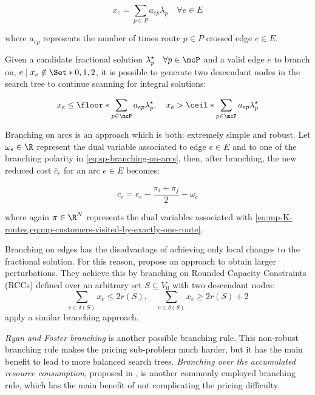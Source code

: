 \begin{equation}
	x_e = \sum_{p \in P} a_{ep} \lambda_p  \quad \forall e \in E
\end{equation}

where $a_{ep}$ represents the number of times route $p \in P$ crossed edge $e \in E$.

Given a candidate fractional solution $\lambda^\star_p \quad \forall p \in \mcP$
and a valid edge $e$ to branch on, $e \mid x_e \notin \Set*{0, 1, 2}$,
it is possible to generate two descendant nodes in the search tree
to continue scanning for integral solutions:

\begin{equation}\label{eq:sp-branching-on-arcs}
	x_e \le \floor*{\sum_{p \in \mcP} a_{ep} \lambda^\star_p}, \quad
	x_e > \ceil*{\sum_{p \in \mcP} a_{ep} \lambda^\star_p}
\end{equation}

Branching on arcs is an approach which is both: extremely simple and robust.
Let $\omega_e \in \R$ represent the dual variable associated to
edge $e \in E$ and to
one of the branching polarity in \cref{eq:sp-branching-on-arcs},
then, after branching,
the new reduced cost $\bar{c}_e$ for an arc $e \in E$ becomes:

\begin{equation}
	\bar{c}_e = c_e - \frac{\pi_i + \pi_j}{2} - \omega_e
\end{equation}

where again $\pi \in \R^N$ represents the dual variables associated with \cref{eq:mp-K-routes,eq:mp-customers-visited-by-exactly-one-route}.

Branching on edges has the disadvantage of achieving only local changes
to the fractional solution.
For this reason, \textcite{augerat1998} propose an
approach to obtain larger perturbations.
They achieve this by branching on Rounded Capacity Constraints (RCCs) defined over
an arbitrary set $S \subseteq V_0$ with two descendant nodes:
\begin{equation}\label{eq:sp-branching-on-cutsets}
	\sum_{e \in \delta(S)}x_e \le 2 r(S), \quad
	\sum_{e \in \delta(S)}x_e \ge 2 r(S) + 2
\end{equation}
\textcite{pecin2017improved} apply a similar branching approach.

\textit{Ryan and Foster branching} \parencite{ryan1981integer} is another possible branching rule.
This non-robust branching rule makes the pricing sub-problem much harder,
but it has the main benefit to lead to more balanced search trees.
\textit{Branching over the accumulated resource consumption}, proposed in \textcite{gelinas1995new},
is another commonly employed branching rule, which has the main benefit of not complicating
the pricing difficulty.

